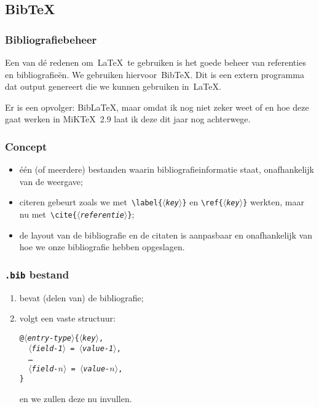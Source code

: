 \subsection{Bib\TeX}
\begin{frame}
  \frametitle{Bibliografiebeheer}

  Een van d\'e redenen om~\LaTeX\ te gebruiken is het goede beheer van referenties en bibliografie\"en. We gebruiken hiervoor~Bib\TeX. Dit is een extern programma dat output genereert die we kunnen gebruiken in~\LaTeX.

  \begin{exampleblock}
    Er is een opvolger: Bib\LaTeX, maar omdat ik nog niet zeker weet of en hoe deze gaat werken in MiK\TeX~2.9 laat ik deze dit jaar nog achterwege.
  \end{exampleblock}
\end{frame}

\begin{frame}
  \frametitle{Concept}

  \begin{itemize}
    \item \'e\'en (of meerdere) bestanden waarin bibliografie\-informatie staat, onafhankelijk van de weergave;
    \item citeren gebeurt zoals we met~\texttt{\textcolor{uagreen}{\textbackslash label}\{$\langle$\textsl{key}$\rangle$\}} en \texttt{\textcolor{uagreen}{\textbackslash ref}\{$\langle$\textsl{key}$\rangle$\}} werkten, maar nu met~\texttt{\textcolor{uagreen}{\textbackslash cite}\{$\langle$\textsl{referentie}$\rangle$\}};
    \item de layout van de bibliografie en de citaten is aanpasbaar en onafhankelijk van hoe we onze bibliografie hebben opgeslagen.
  \end{itemize}
\end{frame}

\begin{frame}
  \frametitle{\texttt{.bib} bestand}

  \begin{enumerate}
    \item bevat (delen van) de bibliografie;
    \item volgt een vaste structuur:

      \texttt{@\textsl{$\langle$entry-type$\rangle$}\{\textsl{$\langle$key$\rangle$},\\
      \ \ \textsl{$\langle$field-1$\rangle$} = \textsl{$\langle$value-1$\rangle$}, \\
      \ \ \ldots \\
      \ \ \textsl{$\langle$field-$n\rangle$} = \textsl{$\langle$value-$n\rangle$}, \\
      \}}
      
      en we zullen deze nu invullen.
  \end{enumerate}
\end{frame}

